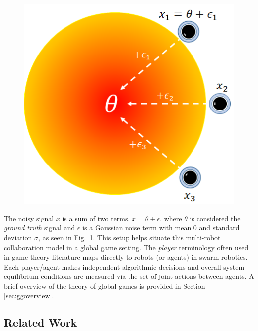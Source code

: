 \documentclass[conference]{IEEEtran}
\begin{document}
\begin{figure}[!ht]
\centering\includegraphics[width=.75\columnwidth]{../figures/globalgamesetup.png}
\centering\caption{}\label{fig:ggsetup}
\end{figure}

The noisy signal $x$ is a sum of two terms, $x = \theta + \epsilon$, where $\theta$ is considered the \emph{ground truth} signal and $\epsilon$ is a Gaussian noise term with mean $0$ and standard deviation $\sigma$, as seen in Fig.~\ref{fig:ggsetup}. This setup helps situate this multi-robot collaboration model in a global game setting. The \emph{player} terminology often used in game theory literature maps directly to robots (or agents) in swarm robotics. Each player/agent makes independent algorithmic decisions and overall system equilibrium conditions are measured via the set of joint actions between agents. A brief overview of the theory of global games is provided in Section \ref{sec:ggoverview}.

\subsection{Related Work}\label{subsec:rw}
\end{document}
